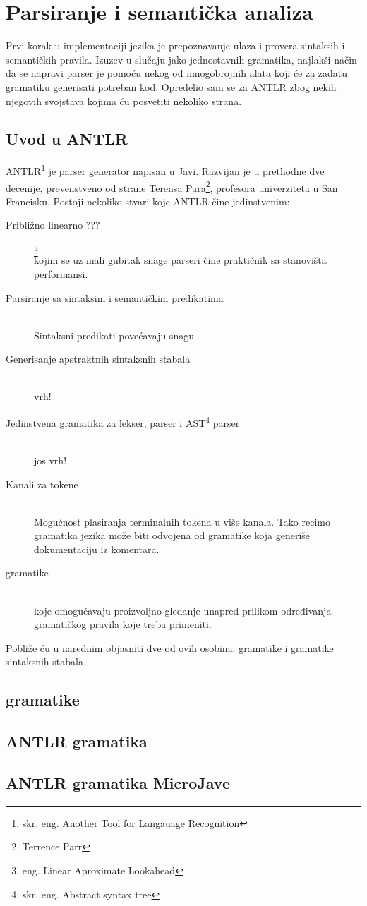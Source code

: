 \chapter{Parsiranje i semantička analiza}

Prvi korak u implementaciji jezika je prepoznavanje ulaza i provera sintaksih i semantičkih pravila. Izuzev u slučaju jako jednostavnih gramatika, najlakši način da se napravi parser je pomoću nekog od mnogobrojnih alata koji će za zadatu gramatiku generisati potreban kod. Opredelio sam se za ANTLR zbog nekih njegovih svojstava kojima ću posvetiti nekoliko strana.

\section{Uvod u ANTLR}

ANTLR\footnote{skr. eng. Another Tool for Langauage Recognition} je parser generator napisan u Javi. Razvijan je u prethodne dve decenije, prevenstveno od strane Terensa Para\footnote{Terrence Parr}, profesora univerziteta u San Francisku. Postoji nekoliko stvari koje ANTLR čine jedinstvenim:\cite{antlr-contrib}

\begin{description}

	\item[Približno linearno ???]\footnote{eng. Linear Aproximate Lookahead} \hfill \\
	kojim se uz mali gubitak snage \LLk parseri čine praktičnik sa stanovišta performansi. 
	\item[Parsiranje sa sintaksim i semantičkim predikatima] \hfill \\
	Sintaksni predikati povećavaju snagu 
	\item[Generisanje apstraktnih sintaksnih stabala] \hfill \\
	vrh!
	\item[Jedinstvena gramatika za lekser, parser i AST\footnote{skr. eng. Abstract syntax tree}  parser] \hfill \\
	jos vrh!
	\item[Kanali za tokene] \hfill \\
	Mogućnost plasiranja terminalnih tokena u više kanala. Tako recimo gramatika jezika može biti odvojena od gramatike koja generiše dokumentaciju iz komentara.
	\item [\LLa {} gramatike] \hfill \\
	koje omogućavaju proizvoljno gledanje unapred prilikom određivanja gramatičkog pravila koje treba primeniti.

\end{description}

Pobliže ću u narednim objasniti dve od ovih osobina: \LLa gramatike i gramatike sintaksnih stabala.

\section{\LLa {} gramatike}



\section{ANTLR gramatika}


\section{ANTLR gramatika MicroJave}
